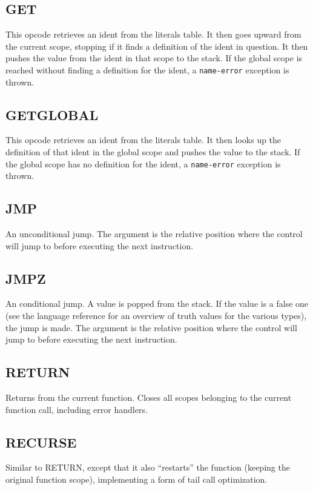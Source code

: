 \subsection{GET}
\label{sec:get}
This opcode retrieves an ident from the literals table. It then goes
upward from the current scope, stopping if it finds a definition of the
ident in question. It then pushes the value from the ident in that scope
to the stack. If the global scope is reached without finding a
definition for the ident, a \verb!name-error! exception is thrown.

\subsection{GET\textunderscore{}GLOBAL}
\label{sec:get-global}
This opcode retrieves an ident from the literals table. It then looks up
the definition of that ident in the global scope and pushes the value to
the stack. If the global scope has no definition for the ident, a
\verb!name-error! exception is thrown.

\subsection{JMP}
\label{sec:jmp}
An unconditional jump. The argument is the relative position where the
control will jump to before executing the next instruction.

\subsection{JMPZ}
\label{sec:jmpz}
An conditional jump. A value is popped from the stack. If the value is
a false one (see the language reference for an overview of truth values
for the various types), the jump is made. The argument is the relative
position where the control will jump to before executing the next
instruction.

\subsection{RETURN}
\label{sec:return}
Returns from the current function. Closes all scopes belonging to the
current function call, including error handlers.

\subsection{RECURSE}
\label{sec:recurse}
Similar to RETURN, except that it also ``restarts'' the function
(keeping the original function scope), implementing a form of tail call
optimization.

